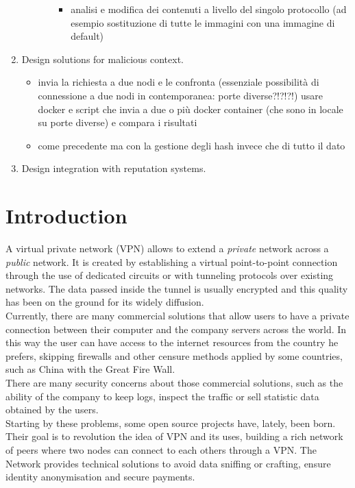 \documentclass[]{article}
\begin{document}
\begin{enumerate}
\begin{enumerate}
\begin{itemize}
\begin{itemize}
							\item analisi e modifica dei contenuti a livello del singolo protocollo (ad esempio sostituzione di tutte le immagini con una immagine di default)
						\end{itemize}
					\end{itemize}	
				\end{enumerate}
			\item Design solutions for malicious context.
				\begin{itemize}
					\item invia la richiesta a due nodi e le confronta (essenziale possibilità di connessione a due nodi in contemporanea: porte diverse?!?!?!) usare docker e script che invia a due o più docker container (che sono in locale su porte diverse) e compara i risultati
					\item come precedente ma con la gestione degli hash invece che di tutto il dato
				\end{itemize}
			\item Design integration with reputation systems.
			
	\end{enumerate}
	
	\section{Introduction}
	
	A virtual private network (VPN) allows to extend a \textit{private} network across a \textit{public} network. It is created by establishing a virtual point-to-point connection through the use of dedicated circuits or with tunneling protocols over existing networks. The data passed inside the tunnel is usually encrypted and this quality has been on the ground for its widely diffusion.\\
	
	Currently, there are many commercial solutions that allow users to have a private connection between their computer and the company servers across the world. In this way the user can have access to the internet resources from the country he prefers, skipping firewalls and other censure methods applied by some countries, such as China with the Great Fire Wall.\\
	There are many security concerns about those commercial solutions, such as the ability of the company to keep logs, inspect the traffic or sell statistic data obtained by the users.\\
	Starting by these problems, some open source projects have, lately, been born. Their goal is to revolution the idea of VPN and its uses, building a rich network of peers where two nodes can connect to each others through a VPN. The Network provides technical solutions to avoid data sniffing or crafting, ensure identity anonymisation and secure payments.\\
	
\end{document}
